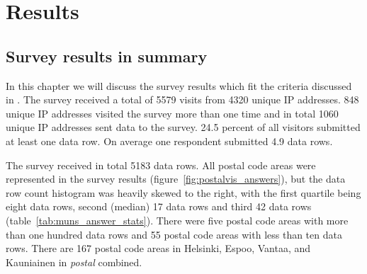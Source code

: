 \section{Results}
\subsection{Survey results in summary}
\justify

In this chapter we will discuss the survey results which fit the criteria discussed in \hyperref[sec:processdata]{}. The survey received a total of 5579 visits from 4320 unique IP addresses. 848 unique IP addresses visited the survey more than one time and in total 1060 unique IP addresses sent data to the survey. 24.5 percent of all visitors submitted at least one data row. On average one respondent submitted 4.9 data rows. 

The survey received in total 5183 data rows. All postal code areas were represented in the survey results (figure~\ref{fig:postalvis_answers}), but the data row count histogram was heavily skewed to the right, with the first quartile being eight data rows, second (median) 17 data rows and third 42 data rows (table~\ref{tab:muns_answer_stats}). There were five postal code areas with more than one hundred data rows and 55 postal code areas with less than ten data rows. There are 167 postal code areas in Helsinki, Espoo, Vantaa, and Kauniainen in \textit{postal} combined.

